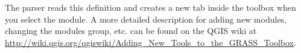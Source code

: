 The parser reads this definition and creates a new tab inside the toolbox 
when you select the module. A more detailed description for adding new 
modules, changing the modules group, etc. can be found on the QGIS wiki at \\
\url{http://wiki.qgis.org/qgiswiki/Adding\_New\_Tools\_to\_the\_GRASS\_Toolbox}.

\FloatBarrier
